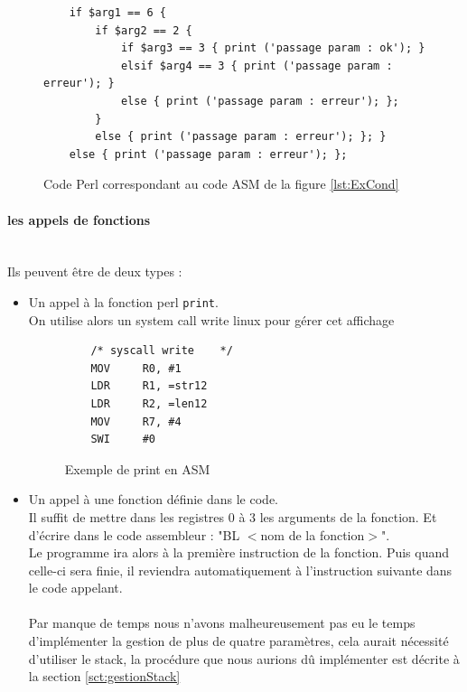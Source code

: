 \documentclass[a4paper,10pt]{article}
\begin{document}
\begin{figure}[H]
\begin{lstlisting}
	if $arg1 == 6 { 
		if $arg2 == 2 {
			if $arg3 == 3 { print ('passage param : ok'); }
			elsif $arg4 == 3 { print ('passage param : erreur'); } 
			else { print ('passage param : erreur'); };
		}
		else { print ('passage param : erreur'); }; }
	else { print ('passage param : erreur'); };
\end{lstlisting}
\fontfamily{}
\caption{Code Perl correspondant au code ASM de la figure \ref{lst:ExCond}}
\label{lst:ExCondSource}
\end{figure}


		\paragraph{les appels de fonctions}~\\
		Ils peuvent être de deux types : \begin{itemize}
			\item Un appel à la fonction perl \verb?print?.\\
				On utilise alors un system call write linux pour gérer cet affichage
\begin{figure}[H]
\begin{lstlisting}
	/* syscall write	*/ 
	MOV 	R0, #1
	LDR 	R1, =str12
	LDR 	R2, =len12
	MOV 	R7, #4
	SWI 	#0
\end{lstlisting}
\fontfamily{}
\caption{Exemple de print en ASM}
\label{lst:ExPrintPerl}
\end{figure}
			
			\item Un appel à une fonction définie dans le code.\\
				Il suffit de mettre dans les registres 0 à 3 les arguments de la fonction. Et d'écrire dans le code assembleur : "BL $<$nom de la fonction$>$".\\
				Le programme ira alors à la première instruction de la fonction. Puis quand celle-ci sera finie, il reviendra automatiquement à l'instruction suivante dans le code appelant.\\
				~\\
				Par manque de temps nous n'avons malheureusement pas eu le temps d'implémenter la gestion de plus de quatre paramètres, cela aurait nécessité d'utiliser le stack, la procédure que nous aurions dû implémenter est décrite à la section \ref{sct:gestionStack}
		\end{itemize}
		
\end{document}
